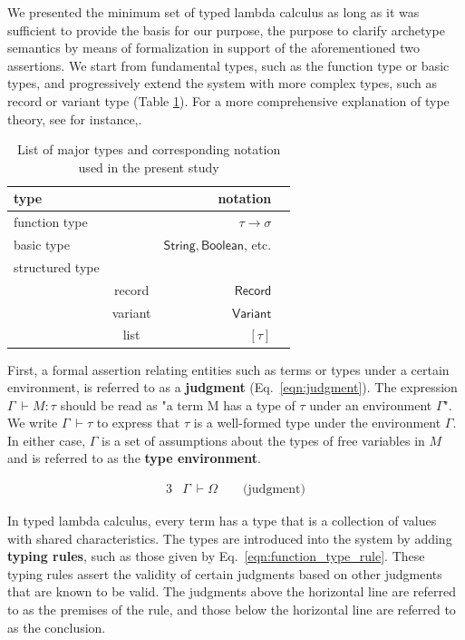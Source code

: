 \documentclass[preprint,3p,onecolumn,times,review]{elsarticle}
\begin{document}
We presented the minimum set of typed lambda calculus as long as it was sufficient to provide the basis for our purpose, the purpose to clarify archetype semantics by means of formalization in support of the aforementioned two assertions.
We start from fundamental types, such as the function type or basic types, and progressively extend the system with more complex types, such as record or variant type (Table \ref{tab:types_notations}).
For a more comprehensive explanation of type theory, see for instance,\cite{pierce02:_types_progr_languag,mitchell00:_found_progr_languag,harper13:_pract_found_progr_languag}.


\begin{table}[!htbp]
  \centering
  \caption{List of major types and corresponding notation used in the present study}\label{tab:types_notations}
  \vspace{6pt}
  \begin{tabular}{lcrr}
    \toprule %
    type &  & notation \\
    \midrule
    function type &  & \(\tau \rightarrow \sigma \)\\
    basic type    &  & \(\mathsf{String}, \mathsf{Boolean}\), etc.\\
    structured type &  \\
    & record & \(\mathsf{Record}\)\\
    & variant & \(\mathsf{Variant}\)\\
    & list & \([\tau]\)\\
    \bottomrule%
  \end{tabular}
\end{table}

First, a formal assertion relating entities such as terms or types under a certain environment, is referred to as a {\bf judgment} (Eq.~\ref{eqn:judgment}).
The expression $\Gamma ~ \vdash M:\tau$ should be read as "a term M has a type of $\tau$ under an environment $\Gamma$". We write $\Gamma ~ \vdash \tau$ to express that $\tau$ is a well-formed type under the environment $\Gamma$. In either case, $\Gamma$  is a set of assumptions about the types of free variables in $M$ and is referred to as the {\bf type environment}.

\begin{alignat}{3}
  & {\Gamma~ \vdash \Omega} \qquad  \text{(judgment)}  \label{eqn:judgment}
\end{alignat}


In typed lambda calculus, every term has a type that is a collection of values with shared characteristics.
The types are introduced into the system by adding {\bf typing rules}, such as those given by Eq.~\ref{eqn:function_type_rule}.
These typing rules assert the validity of certain judgments based on other judgments that are known to be  valid.
The judgments above the horizontal line are referred to as the premises of the rule, and those below the horizontal line are referred to as the conclusion.
\end{document}
